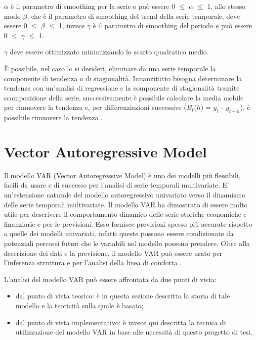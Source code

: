 \documentclass[12pt,a4paper,twoside,openright]{book}
\begin{document}
$\alpha$ è il parametro di smoothing per la serie e può essere 0 $\leq$ $\alpha$ $\leq$ 1, allo stesso modo $\beta$, che è il parametro di smoothing del trend della serie temporale, deve essere 0 $\leq$ $\beta$ $\leq$ 1, invece $\gamma$ è il parametro di smoothing del periodo e può essere 0 $\leq$ $\gamma$ $\leq$ 1. 

$\gamma$ deve essere ottimizzato minimizzando lo scarto quadratico medio.

\medskip \medskip

È possibile, nel caso lo si desideri, eliminare da una serie temporale la componente di tendenza o di stagionalità.
Innanzitutto bisogna determinare la tendenza con un'analisi di regressione e la componente di stagionalità tramite scomposizione della serie, successivamente è possibile calcolare la media mobile per rimuovere la tendenza e, per differenziazioni successive ($B_{t}$($h$) = $y_{t}$ - $y_{t-h}$), è possibile rimuovere la tendenza \cite{8a}.

\newpage
\section{Vector Autoregressive Model}
Il modello VAR (Vector Autoregressive Model) è uno dei modelli  più flessibili, facili da usare e di successo per l'analisi di serie temporali multivariate. E' un'estensione naturale del modello autoregressivo univariato verso il dinamismo delle serie temporali multivariate. Il modello VAR ha dimostrato di essere molto utile per descrivere il comportamento dinamico delle serie storiche economiche e finanziarie e per le previsioni. Esso fornisce previsioni spesso più accurate rispetto a quelle dei modelli univariati, infatti queste possono essere condizionate da potenziali percorsi futuri che le variabili nel modello possono prendere. Oltre alla descrizione dei dati e la previsione, il modello VAR può essere usato per l'inferenza struttura e per l'analisi della linea di condotta \cite{13a}. 

L'analisi del modello VAR può essere affrontata da due punti di vista: 
\begin{itemize}
\item dal punto di vista teorico: è in questa sezione descritta la storia di tale modello e la teoricità sulla quale è basato;
\item dal punto di vista implementativo: è invece qui descritta la tecnica di utilizzazione del modello VAR in base alle necessità di questo progetto di tesi.
\end{itemize}
\newpage 
\end{document}

